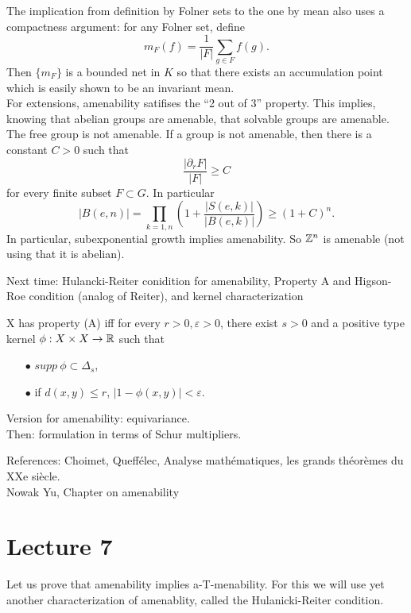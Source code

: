 The implication from definition by Folner sets to the one by mean also uses a compactness argument: for any Folner set, define 
\[m_F(f)= \frac{1}{|F|}\sum_{g\in F}f(g).\]
Then $\{m_F\}$ is a bounded net in $K$ so that there exists an accumulation point which is easily shown to be an invariant mean.\\

For extensions, amenability satifises the ``2 out of 3'' property. This implies, knowing that abelian groups are amenable, that solvable groups are amenable.\\

The free group is not amenable. If a group is not amenable, then there is a constant $C>0$ such that 
\[\frac{|\partial_r F|}{|F|}\geq C\]
for every finite subset $F\subset G$. In particular
\[|B(e,n)| = \prod_{k=1,n} (1 + \frac{|S(e,k)|}{|B(e,k)|}) \geq (1+C)^n.\]
 In particular, subexponential growth implies amenability. So $\mathbb Z^n$ is amenable (not using that it is abelian).
 
Next time:
Hulancki-Reiter conidition for amenability, Property A and Higson-Roe condition (analog of Reiter), and kernel characterization 
\begin{thm}
X has property (A) iff for every $r>0, \varepsilon>0$, there exist $s>0$ and a positive type kernel $\phi: X\times X\rightarrow \mathbb R$ such that 
\begin{itemize}
\item[$\bullet$] $supp \ \phi \subset \Delta_s$,
\item[$\bullet$] if $d(x,y)\leq r$, $|1-\phi(x,y)|<\varepsilon$.
\end{itemize}
\end{thm}
Version for amenability: equivariance.\\

Then: formulation in terms of Schur multipliers.

References: Choimet, Queff\'elec, Analyse math\'ematiques, les grands th\'eor\`emes du XXe si\`ecle.\\
Nowak Yu, Chapter on amenability\\

\section{Lecture 7}

Let us prove that amenability implies a-T-menability. For this we will use yet another characterization of amenablity, called the Hulanicki-Reiter condition.

